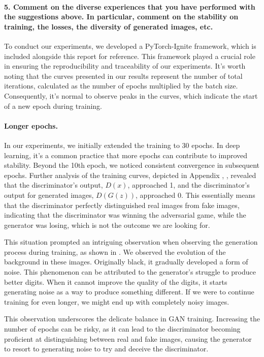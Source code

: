 \newpage
\paragraph*{5. Comment on the diverse experiences that you have performed with the suggestions above. In particular, comment on the stability on training, the losses, the diversity of generated images, etc.}

To conduct our experiments, we developed a PyTorch-Ignite framework, which is included alongside this report for reference. This framework played a crucial role in ensuring the reproducibility and traceability of our experiments. It's worth noting that the curves presented in our results represent the number of total iterations, calculated as the number of epochs multiplied by the batch size. Consequently, it's normal to observe peaks in the curves, which indicate the start of a new epoch during training.

\paragraph*{Longer epochs.}
In our experiments, we initially extended the training to 30 epochs. In deep learning, it's a common practice that more epochs can contribute to improved stability. Beyond the 10th epoch, we noticed consistent convergence in subsequent epochs. Further analysis of the training curves, depicted in Appendix , , revealed that the discriminator's output, $D(x)$, approached 1, and the discriminator's output for generated images, $D(G(z))$, approached 0. This essentially means that the discriminator perfectly distinguished real images from fake images, indicating that the discriminator was winning the adversarial game, while the generator was losing, which is not the outcome we are looking for. 

This situation prompted an intriguing observation when observing the generation process during training, as shown in . We observed the evolution of the background in these images. Originally black, it gradually developed a form of noise. This phenomenon can be attributed to the generator's struggle to produce better digits. When it cannot improve the quality of the digits, it starts generating noise as a way to produce something different. If we were to continue training for even longer, we might end up with completely noisy images. 

This observation underscores the delicate balance in GAN training. Increasing the number of epochs can be risky, as it can lead to the discriminator becoming proficient at distinguishing between real and fake images, causing the generator to resort to generating noise to try and deceive the discriminator.

